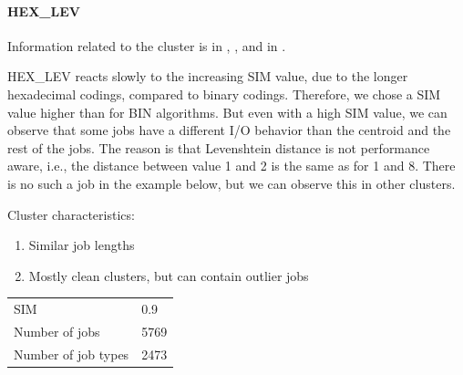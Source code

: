 \documentclass[]{llncs}
\begin{document}
\paragraph{HEX\_LEV}
Information related to the cluster is in , , and in .

HEX\_LEV reacts slowly to the increasing SIM value, due to the longer hexadecimal codings, compared to binary codings.
Therefore, we chose a SIM value higher than for BIN algorithms.
But even with a high SIM value, we can observe that some jobs have a different I/O behavior than the centroid and the rest of the jobs.
The reason is that Levenshtein distance is not performance aware, i.e., the distance between value 1 and 2 is the same as for 1 and 8.
There is no such a job in the example below, but we can observe this in other clusters.

Cluster characteristics:

\begin{enumerate}
 \item Similar job lengths
 \item Mostly clean clusters, but can contain outlier jobs
\end{enumerate}

\begingroup
	\centering
	\begin{tabular}{ll}
		SIM & 0.9 \\
		Number of jobs & 5769 \\
		Number of job types & 2473 \\
	\end{tabular}
	\label{tab:hex_lev:stats}
\endgroup
\end{document}

